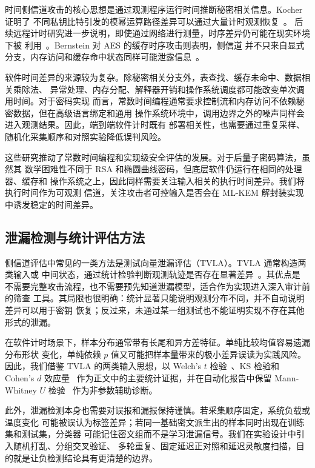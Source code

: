 \documentclass[a4paper,fontset=none]{ctexart}
\begin{document}
时间侧信道攻击的核心思想是通过观测程序运行时间推断秘密相关信息。Kocher 证明了
不同私钥比特引发的模幂运算路径差异可以通过大量计时观测恢复~\cite{Kocher1996}。
后续远程计时研究进一步说明，即使通过网络进行测量，时序差异仍可能在现实环境下被
利用~\cite{Brumley2005}。Bernstein 对 AES 的缓存时序攻击则表明，侧信道
并不只来自显式分支，内存访问和缓存命中状态同样可能泄露信息~\cite{Bernstein2005}。

软件时间差异的来源较为复杂。除秘密相关分支外，表查找、缓存未命中、数据相关乘除法、
异常处理、内存分配、解释器开销和操作系统调度都可能改变单次调用时间。对于密码实现
而言，常数时间编程通常要求控制流和内存访问不依赖秘密数据，但在高级语言绑定和通用
操作系统环境中，调用边界之外的噪声同样会进入观测结果。因此，端到端软件计时既有
部署相关性，也需要通过重复采样、随机化采集顺序和对照实验降低误判风险。

这些研究推动了常数时间编程和实现级安全评估的发展。对于后量子密码算法，虽然其
数学困难性不同于 RSA 和椭圆曲线密码，但底层软件仍运行在相同的处理器、缓存和
操作系统之上，因此同样需要关注输入相关的执行时间差异。我们将执行时间作为可观测
信道，关注攻击者可控输入是否会在 ML-KEM 解封装实现中诱发稳定的时间差异。

\subsection{泄漏检测与统计评估方法}

侧信道评估中常见的一类方法是测试向量泄漏评估（TVLA）。TVLA 通常构造两类输入或
中间状态，通过统计检验判断观测轨迹是否存在显著差异~\cite{Becker2013}。其优点是
不需要完整攻击流程，也不需要预先知道泄漏模型，适合作为实现进入深入审计前的筛查
工具。其局限也很明确：统计显著只能说明观测分布不同，并不自动说明差异可以用于密钥
恢复；反过来，未通过某一组测试也不能证明实现不存在其他形式的泄漏。

在软件计时场景下，样本分布通常带有长尾和异方差特征。单纯比较均值容易遗漏分布形状
变化，单纯依赖 $p$ 值又可能把样本量带来的极小差异误读为实践风险。因此，我们借鉴
TVLA 的两类输入思想，以 Welch's $t$ 检验~\cite{Welch1947}、KS 检验和 Cohen's $d$
效应量~\cite{Cohen1988} 作为正文中的主要统计证据，并在自动化报告中保留
Mann-Whitney $U$ 检验~\cite{Mann1947} 作为非参数辅助诊断。

此外，泄漏检测本身也需要对误报和漏报保持谨慎。若采集顺序固定，系统负载或温度变化
可能被误认为标签差异；若同一基础密文派生出的样本同时出现在训练集和测试集，分类器
可能记住密文组而不是学习泄漏信号。我们在实验设计中引入随机打乱、分组交叉验证、
多轮重复、固定延迟正对照和延迟灵敏度扫描，目的就是让负检测结论具有更清楚的边界。
\end{document}

